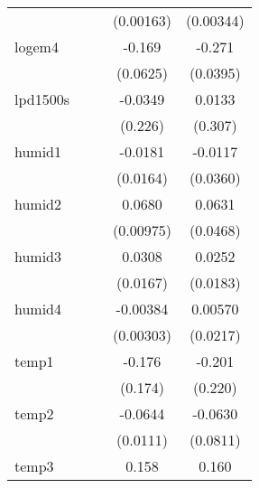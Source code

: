 {\begin{tabular}{l*{4}{c}}
            &                     &                     &   (0.00163)         &   (0.00344)         \\
[1em]
logem4      &                     &                     &      -0.169\sym{*}  &      -0.271\sym{***}\\
            &                     &                     &    (0.0625)         &    (0.0395)         \\
[1em]
lpd1500s    &                     &                     &     -0.0349         &      0.0133         \\
            &                     &                     &     (0.226)         &     (0.307)         \\
[1em]
humid1      &                     &                     &     -0.0181         &     -0.0117         \\
            &                     &                     &    (0.0164)         &    (0.0360)         \\
[1em]
humid2      &                     &                     &      0.0680\sym{***}&      0.0631         \\
            &                     &                     &   (0.00975)         &    (0.0468)         \\
[1em]
humid3      &                     &                     &      0.0308         &      0.0252         \\
            &                     &                     &    (0.0167)         &    (0.0183)         \\
[1em]
humid4      &                     &                     &    -0.00384         &     0.00570         \\
            &                     &                     &   (0.00303)         &    (0.0217)         \\
[1em]
temp1       &                     &                     &      -0.176         &      -0.201         \\
            &                     &                     &     (0.174)         &     (0.220)         \\
[1em]
temp2       &                     &                     &     -0.0644\sym{***}&     -0.0630         \\
            &                     &                     &    (0.0111)         &    (0.0811)         \\
[1em]
temp3       &                     &                     &       0.158\sym{*}  &       0.160\sym{**} \\

\end{tabular}}
